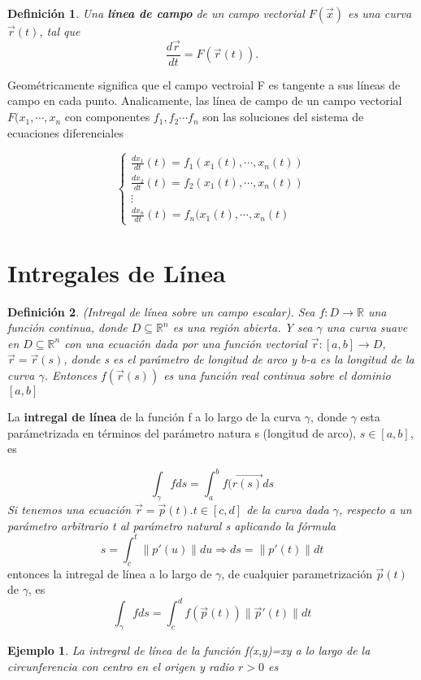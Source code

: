 \documentclass[11pt]{book}
\numberwithin{equation}{section}
\theoremstyle{plain}  %
\newtheorem{Def}{Definición}[chapter]
\newtheorem{Ej}{Ejemplo}[chapter]
\providecommand{\norm}[1]{\lVert#1\rVert} %
\begin{document}
{\it
\begin{Def}
Una \textbf{línea de campo} de un campo vectorial $F(\vec{x})$ es una curva $\vec{r}(t)$, tal que
\begin{equation*}
    \frac{d\vec{r}}{dt} = F(\vec{r}(t)).
\end{equation*}
\end{Def}
Geométricamente significa que el campo vectroial F es tangente a sus líneas de campo en cada punto. 
Analicamente, las línea de campo de un campo vectorial $F(x_{1}, \cdots, x_{n}$ con componentes $f_{1},f_{2} \cdots f_{n}$ son las soluciones del sistema de ecuaciones diferenciales 
}
\begin{equation*}
\begin{cases}
\frac{dx_{1}}{dt}(t)=f_{1}(x_{1}(t), \cdots , x_{n}(t)) \\
\frac{dx_{2}}{dt}(t)=f_{2}(x_{1}(t), \cdots , x_{n}(t)) \\ 
\vdots \\ 
\frac{dx_{n}}{dt}(t) = f_{n}(x_{1}(t),\cdots , x_{n}(t)
\end{cases}
\end{equation*}

\section{Intregales de Línea}
{\it 
\begin{Def}
(Intregal de línea sobre un campo escalar). Sea $f: D \to \mathbb{R}$ una función continua, donde $D \subseteq \mathbb{R}^{n}$ es una región abierta. Y sea $\gamma$ una curva suave en $D \subseteq \mathbb{R}^{n}$ con una ecuación dada por una función vectorial $\vec{r}:[a,b] \to D$, $\vec{r} = \vec{r}(s)$, donde s es el parámetro de longitud de arco y b-a es la longitud de la curva $\gamma$. Entonces $f(\vec{r}(s))$ es una función real continua sobre el dominio $[a,b]$
\end{Def}
La \textbf{intregal de línea} de la función f a lo largo de la curva $\gamma$, donde $\gamma$ esta parámetrizada en términos del parámetro natura s (longitud de arco), $s\in [a,b]$, es 
}
\begin{equation*}
    \int_{\gamma}fds=\int_{a}^{b}f(\vec{r(s)}ds
\end{equation*}
{\it
Si tenemos una ecuación $\vec{r} = \vec{p}(t). t \in [c,d]$ de la curva dada $\gamma$, respecto a un parámetro arbitrario t al parámetro natural s aplicando la fórmula }
\begin{equation*}
    s = \int_{c}^{t} \norm{p'(u)}du \Rightarrow ds = \norm{p'(t)}dt
\end{equation*}
\newpage
\noindent entonces la intregal de línea a lo largo de $\gamma$, de cualquier parametrización $\vec{p}(t)$ de $\gamma$, es
\begin{equation*}
    \int_{\gamma}fds = \int_{c}^{d} f(\vec{p}(t)) \norm{\vec{p}'(t)}dt
\end{equation*}
\begin{Ej}
La intregral de línea de la función f(x,y)=xy a lo largo de la circunferencia con centro en el origen y radio $r>0$ es 
\end{Ej}
\end{document}
